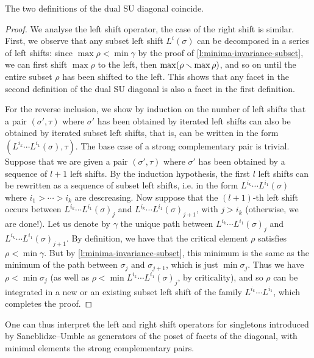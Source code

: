 \begin{proposition}
    The two definitions of the dual SU diagonal coincide. 
\end{proposition}

\begin{proof}
    We analyse the left shift operator, the case of the right shift is similar. 
    First, we observe that any subset left shift $L^{i}(\sigma)$ can be decomposed in a series of left shifts: since $\max \rho < \min \gamma$ by the proof of \cref{l:minima-invariance-subset}, we can first shift $\max \rho$ to the left, then $\max (\rho \smallsetminus \max \rho)$, and so on until the entire subset $\rho$ has been shifted to the left. 
    This shows that any facet in the second definition of the dual SU diagonal is also a facet in the first definition. 

    For the reverse inclusion, we show by induction on the number of left shifts that a pair $(\sigma',\tau)$ where $\sigma'$ has been obtained by iterated left shifts can also be obtained by iterated subset left shifts, that is, can be written in the form $(L^{i_k}\cdots L^{i_1}(\sigma), \tau)$.
    The base case of a strong complementary pair is trivial. 
    Suppose that we are given a pair $(\sigma',\tau)$ where $\sigma'$ has been obtained by a sequence of $l+1$ left shifts. 
    By the induction hypothesis, the first $l$ left shifts can be rewritten as a sequence of subset left shifts, i.e. in the form $L^{i_k}\cdots L^{i_1}(\sigma)$ where $i_1 > \cdots > i_k$ are descreasing.
    Now suppose that the $(l+1)$-th left shift occurs between $L^{i_k}\cdots L^{i_1}(\sigma)_j$ and $L^{i_k}\cdots L^{i_1}(\sigma)_{j+1}$, with $j> i_k$ (otherwise, we are done!). 
    Let us denote by $\gamma$ the unique path between $L^{i_k}\cdots L^{i_1}(\sigma)_j$ and $L^{i_k}\cdots L^{i_1}(\sigma)_{j+1}$.
    By definition, we have that the critical element $\rho$ satisfies $\rho < \min \gamma$.  
    But by \cref{l:minima-invariance-subset}, this minimum is the same as the minimum of the path between $\sigma_j$ and $\sigma_{j+1}$, which is just $\min \sigma_j$. 
    Thus we have $\rho < \min \sigma_j$ (as well as $\rho < \min L^{i_k}\cdots L^{i_1}(\sigma)_j$, by criticality), and so $\rho$ can be integrated in a new or an existing subset left shift of the family $L^{i_k}\cdots L^{i_1}$, which completes the proof. 
\end{proof}

One can thus interpret the left and right shift operators for singletons introduced by Saneblidze--Umble as generators of the poset of facets of the diagonal, with minimal elements the strong complementary pairs.

